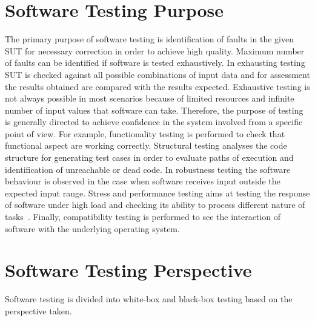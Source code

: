 \section{Software Testing Purpose}
The primary purpose of software testing is identification of faults in the given SUT for necessary correction in order to achieve high quality. Maximum number of faults can be identified if software is tested exhaustively. In exhausting testing SUT is checked against all possible combinations of input data and for assessment the results obtained are compared with the results expected. Exhaustive testing is not always possible in most scenarios because of limited resources and infinite number of input values that software can take. Therefore, the purpose of testing is generally directed to achieve confidence in the system involved from a specific point of view. For example, functionality testing is performed to check that functional aspect are working correctly. Structural testing analyses the code structure for generating test cases in order to evaluate paths of execution and identification of unreachable or dead code. In robustness testing the software behaviour is observed in the case when software receives input outside the expected input range. Stress and performance testing aims at testing the response of software under high load and checking its ability to process different nature of tasks~\cite{cohen2005robustness}. Finally, compatibility testing is performed to see the interaction of software with the underlying operating system.

\section{Software Testing Perspective}
Software testing is divided into white-box and black-box testing based on the perspective taken.


